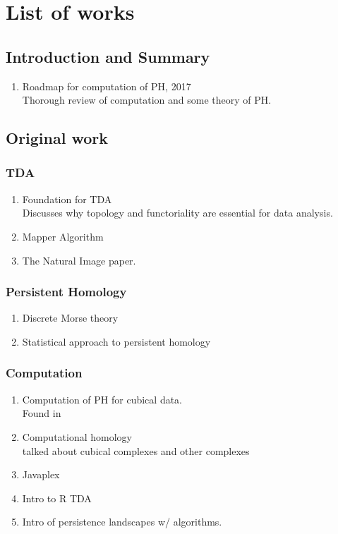 \documentclass[10pt,a4paper]{article}
\begin{document}
\section{List of works}
\subsection{Introduction and Summary}
\begin{enumerate}
	\item \cite{Otter2017} Roadmap for computation of PH, 2017\\
		  Thorough review of computation and some theory of PH.

\end{enumerate}
\subsection{Original work}
\subsubsection{TDA}
\begin{enumerate}
	\item \cite{Carlsson2009} Foundation for TDA\\
		  Discusses why topology and functoriality are essential for data analysis.
	\item \cite{Singh2007} Mapper Algorithm
	\item \cite{Carlsson2008} The Natural Image paper.
\end{enumerate}
\subsubsection{Persistent Homology}
\begin{enumerate}
	\item \cite{Mischaikow2013} Discrete Morse theory
	\item \cite{Bubenik2007} Statistical approach to persistent homology
\end{enumerate}
\subsubsection{Computation}
\begin{enumerate}
	\item \cite{Wagner2012} Computation of PH for cubical data.\\
		  Found in \cite{Otter2017}
	\item \cite{Kaczynski2004} Computational homology\\
	talked about cubical complexes and other complexes
	\item \cite{Javaplex} Javaplex
	\item \cite{Fasy2014} Intro to R TDA
	\item \cite{Bubenik2017} Intro of persistence landscapes w/ algorithms.
\end{enumerate}
\end{document}
